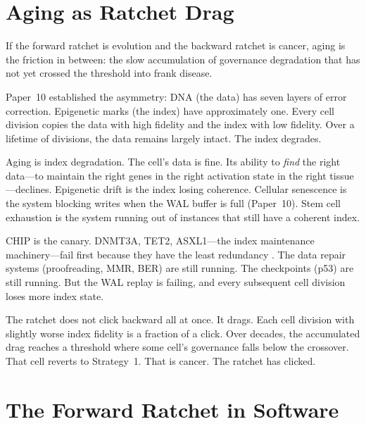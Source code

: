 \documentclass[11pt]{article}
\theoremstyle{definition}
\begin{document}
\section{Aging as Ratchet Drag}
\label{sec:aging}

If the forward ratchet is evolution and the backward ratchet is
cancer, aging is the friction in between: the slow accumulation of
governance degradation that has not yet crossed the threshold into
frank disease.

Paper~10 established the asymmetry: DNA (the data) has seven layers
of error correction. Epigenetic marks (the index) have approximately
one. Every cell division copies the data with high fidelity and the
index with low fidelity. Over a lifetime of divisions, the data
remains largely intact. The index degrades.

Aging is index degradation. The cell's data is fine. Its ability to
\emph{find} the right data---to maintain the right genes in the right
activation state in the right tissue---declines. Epigenetic drift is
the index losing coherence. Cellular senescence is the system
blocking writes when the WAL buffer is full (Paper~10). Stem cell
exhaustion is the system running out of instances that still have a
coherent index.

CHIP is the canary. DNMT3A, TET2, ASXL1---the index maintenance
machinery---fail first because they have the least redundancy
\cite{Jaiswal2014}. The data repair systems (proofreading, MMR, BER)
are still running. The checkpoints (p53) are still running. But the
WAL replay is failing, and every subsequent cell division loses more
index state.

The ratchet does not click backward all at once. It drags. Each
cell division with slightly worse index fidelity is a fraction of
a click. Over decades, the accumulated drag reaches a threshold
where some cell's governance falls below the crossover. That cell
reverts to Strategy~1. That is cancer. The ratchet has clicked.

\section{The Forward Ratchet in Software}
\label{sec:software}
\end{document}
